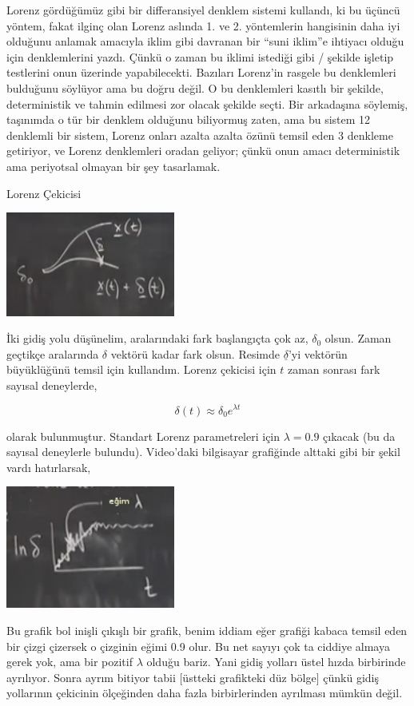 \documentclass[12pt,fleqn]{article}\usepackage{../../common}
\begin{document}
Lorenz gördüğümüz gibi bir differansiyel denklem sistemi kullandı, ki bu
üçüncü yöntem, fakat ilginç olan Lorenz aslında 1. ve 2. yöntemlerin
hangisinin daha iyi olduğunu anlamak amacıyla iklim gibi davranan bir
``suni iklim''e ihtiyacı olduğu için denklemlerini yazdı. Çünkü o zaman bu
iklimi istediği gibi / şekilde işletip testlerini onun üzerinde
yapabilecekti. Bazıları Lorenz'in rasgele bu denklemleri bulduğunu söylüyor
ama bu doğru değil. O bu denklemleri kasıtlı bir şekilde, deterministik ve
tahmin edilmesi zor olacak şekilde seçti. Bir arkadaşına söylemiş,
taşınımda o tür bir denklem olduğunu biliyormuş zaten, ama bu sistem 12
denklemli bir sistem, Lorenz onları azalta azalta özünü temsil eden 3
denkleme getiriyor, ve Lorenz denklemleri oradan geliyor; çünkü onun amacı
deterministik ama periyotsal olmayan bir şey tasarlamak.

Lorenz Çekicisi

\includegraphics[width=15em]{17_05.png}

İki gidiş yolu düşünelim, aralarındaki fark başlangıçta çok az, $\delta_0$
olsun. Zaman geçtikçe aralarında $\delta$ vektörü kadar fark olsun. Resimde
$\underline{\delta}$'yi vektörün büyüklüğünü temsil için kullandım. Lorenz
çekicisi için $t$ zaman sonrası fark sayısal deneylerde,

$$ \delta(t) \approx \delta_0 e^{\lambda t}$$

olarak bulunmuştur. Standart Lorenz parametreleri için $\lambda = 0.9$
çıkacak (bu da sayısal deneylerle bulundu). Video'daki bilgisayar
grafiğinde alttaki gibi bir şekil vardı hatırlarsak,

\includegraphics[width=15em]{17_06.png}

Bu grafik bol inişli çıkışlı bir grafik, benim iddiam eğer grafiği kabaca
temsil eden bir çizgi çizersek o çizginin eğimi 0.9 olur. Bu net sayıyı çok
ta ciddiye almaya gerek yok, ama bir pozitif $\lambda$ olduğu bariz. Yani
gidiş yolları üstel hızda birbirinde ayrılıyor. Sonra ayrım bitiyor tabii
[üstteki grafikteki düz bölge] çünkü gidiş yollarının çekicinin ölçeğinden
daha fazla birbirlerinden ayrılması mümkün değil.
\end{document}
